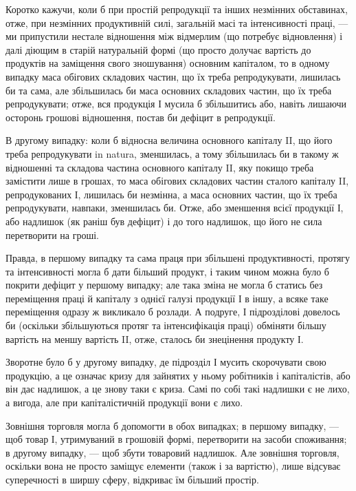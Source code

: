Коротко кажучи, коли б при простій репродукції та інших незмінних
обставинах, отже, при незмінних продуктивній силі, загальній масі та
інтенсивності праці, — ми припустили нестале відношення між відмерлим
(що потребує відновлення) і далі діющим в старій натуральній формі
(що просто долучає вартість до продуктів на заміщення свого зношування)
основним капіталом, то в одному випадку маса обігових складових частин,
що їх треба репродукувати, лишилась би та сама, але збільшилась би
маса основних складових частин, що їх треба репродукувати; отже, вся
продукція І мусила б збільшитись або, навіть лишаючи осторонь грошові
відношення, постав би дефіцит в репродукції.

В другому випадку: коли б відносна величина основного капіталу II,
що його треба репродукувати in natura, зменшилась, а тому збільшилась
би в такому ж відношенні та складова частина основного капіталу II,
яку покищо треба замістити лише в грошах, то маса обігових складових
частин сталого капіталу II, репродукованих І, лишилась би незмінна, а
маса основних частин, що їх треба репродукувати, навпаки, зменшилась
би. Отже, або зменшення всієї продукції І, або надлишок (як раніш був
дефіцит) і до того надлишок, що його не сила перетворити на гроші.

Правда, в першому випадку та сама праця при збільшені продуктивності,
протягу та інтенсивності могла б дати більший продукт, і таким
чином можна було б покрити дефіцит у першому випадку; але така
зміна не могла б статись без переміщення праці й капіталу з однієї галузі
продукції І в іншу, а всяке таке переміщення одразу ж викликало б
розлади. А подруге, І підрозділові довелось би (оскільки збільшуються
протяг та інтенсифікація праці) обміняти більшу вартість на
меншу вартість II, отже, сталось би знецінення продукту І.

Зворотне було б у другому випадку, де підрозділ І мусить скорочувати
свою продукцію, а це означає кризу для зайнятих у ньому робітників
і капіталістів, або він дає надлишок, а це знову таки є криза.
Самі по собі такі надлишки є не лихо, а вигода, але при капіталістичній
продукції вони є лихо.

Зовнішня торговля могла б допомогти в обох випадках; в першому
випадку, — щоб товар І, утримуваний в грошовій формі, перетворити на
засоби споживання; в другому випадку, — щоб збути товаровий надлишок.
Але зовнішня торговля, оскільки вона не просто заміщує елементи (також
і за вартістю), лише відсуває суперечності в ширшу сферу, відкриває їм
більший простір.

